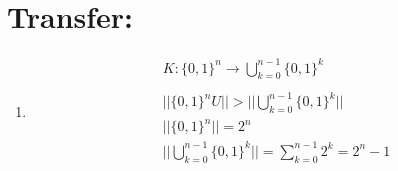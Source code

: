     \section*{Transfer:}
    \begin{enumerate}[label=(\alph*)]
    \item 
    	    \begin{align*}
    	&K:\{0,1\}^n \rightarrow \bigcup _{k=0}^{n-1} \{0,1\}^k  \\
    	\\
        	&||\{0,1\}^n U|| > || \bigcup _{k=0}^{n-1} \{0,1\}^k|| \\
        	&||\{0,1\}^n|| = 2^n \tag{Korollar 1.8}\\
        	&|| \bigcup _{k=0}^{n-1} \{0,1\}^k|| = \sum_{k=0}^{n-1}2^k=2^n-1 \tag{Theorem 1.20}\\
        \end{align*}
    \end{enumerate}







